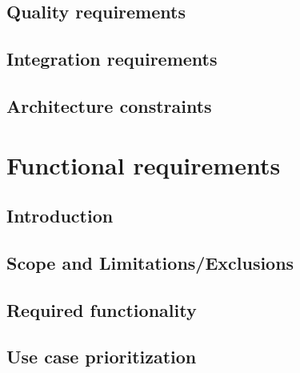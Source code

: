 \documentclass[12pt]{article}
\begin{document}
		\subsection{Quality requirements}
		\vspace{0.2in}
		
		\vspace{0.2in}
		
		\subsection{Integration requirements}
		\vspace{0.2in}
		
		\vspace{0.2in}
		
		\subsection{Architecture constraints}
		\vspace{0.2in}
		
		\vspace{0.5in}
	
	\newpage	
	\section{Functional requirements}
		\subsection{Introduction}
		\vspace{0.2in}
		
		\vspace{0.2in}
		
		\subsection{Scope and Limitations/Exclusions}
		\vspace{0.2in}
		
		\vspace{0.2in}
		
		\subsection{Required functionality}
		\vspace{0.2in}
		
		\vspace{0.2in}
		
		\subsection{Use case prioritization}
		\vspace{0.2in}
		
\end{document}
